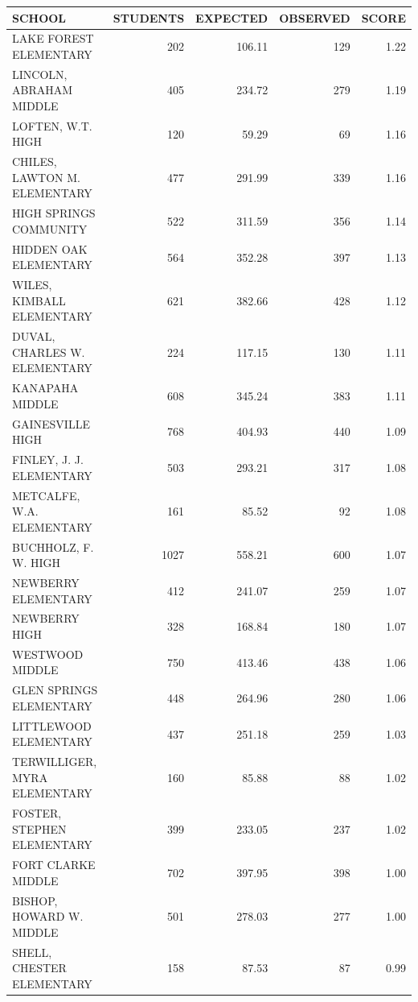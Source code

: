 \begin{table}[H]
\begin{table}[ht]
\centering
{\tiny
\begin{tabular}{lrrrr}
  \hline
SCHOOL & STUDENTS & EXPECTED & OBSERVED & SCORE \\ 
  \hline
LAKE FOREST ELEMENTARY & 202 & 106.11 & 129 & 1.22 \\ 
  LINCOLN, ABRAHAM MIDDLE  & 405 & 234.72 & 279 & 1.19 \\ 
  LOFTEN, W.T. HIGH  & 120 & 59.29 &  69 & 1.16 \\ 
  CHILES, LAWTON M. ELEMENTARY & 477 & 291.99 & 339 & 1.16 \\ 
  HIGH SPRINGS COMMUNITY  & 522 & 311.59 & 356 & 1.14 \\ 
  HIDDEN OAK ELEMENTARY & 564 & 352.28 & 397 & 1.13 \\ 
  WILES, KIMBALL ELEMENTARY & 621 & 382.66 & 428 & 1.12 \\ 
  DUVAL, CHARLES W. ELEMENTARY & 224 & 117.15 & 130 & 1.11 \\ 
  KANAPAHA MIDDLE  & 608 & 345.24 & 383 & 1.11 \\ 
  GAINESVILLE HIGH  & 768 & 404.93 & 440 & 1.09 \\ 
  FINLEY, J. J. ELEMENTARY & 503 & 293.21 & 317 & 1.08 \\ 
  METCALFE, W.A. ELEMENTARY & 161 & 85.52 &  92 & 1.08 \\ 
  BUCHHOLZ, F. W. HIGH  & 1027 & 558.21 & 600 & 1.07 \\ 
  NEWBERRY ELEMENTARY & 412 & 241.07 & 259 & 1.07 \\ 
  NEWBERRY HIGH  & 328 & 168.84 & 180 & 1.07 \\ 
  WESTWOOD MIDDLE  & 750 & 413.46 & 438 & 1.06 \\ 
  GLEN SPRINGS ELEMENTARY & 448 & 264.96 & 280 & 1.06 \\ 
  LITTLEWOOD ELEMENTARY & 437 & 251.18 & 259 & 1.03 \\ 
  TERWILLIGER, MYRA ELEMENTARY & 160 & 85.88 &  88 & 1.02 \\ 
  FOSTER, STEPHEN ELEMENTARY & 399 & 233.05 & 237 & 1.02 \\ 
  FORT CLARKE MIDDLE  & 702 & 397.95 & 398 & 1.00 \\ 
  BISHOP, HOWARD W. MIDDLE  & 501 & 278.03 & 277 & 1.00 \\ 
  SHELL, CHESTER ELEMENTARY & 158 & 87.53 &  87 & 0.99 \\ 

\end{tabular}}
\end{table}
\end{table}
